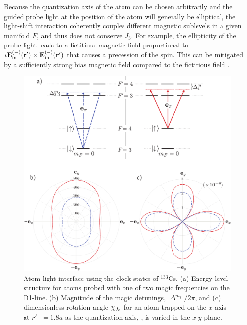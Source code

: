 \documentclass[preprint, aps,pra,onecolumn]{revtex4-1} %
\newcommand{\inp}{{\rm in}}
\begin{document}
Because the quantization axis of the atom can be chosen arbitrarily and the guided probe light at the position of the atom will generally be elliptical, the light-shift interaction coherently couples different magnetic sublevels in a given manifold $F$, and thus does not conserve $J_3$.  For example, the ellipticity of the probe light leads to a fictitious magnetic field proportional to $i \mathbf{E}^{(-)}_{\inp}(\br') \times \mathbf{E}^{(+)}_{\inp}(\br')$ that causes a precession of the {\color{blue} spin}.  This can be mitigated by a sufficiently strong bias magnetic field compared to the fictitious field \cite{smith_continuous_2004}. 


\begin{figure}
\includegraphics[scale=0.44]{./Figs/Fig_MagicFrequencies_alt}
\caption{Atom-light interface using the clock states of $^{133}$Cs.  
(a) Energy level structure for atoms probed with one of two magic frequencies on the D1-line. 
(b) Magnitude of the magic detunings, $|\Delta^{m_f}|/2\pi$, and (c) dimensionless rotation angle  $\chi_{\tiny J_3}$ for an atom trapped on the $x$-axis at $ r'\!_\perp=1.8a $ as the quantization axis, , is varied in the $x$-$y$ plane. }\label{Fig::CouplingStrength}
\end{figure}
\end{document}
